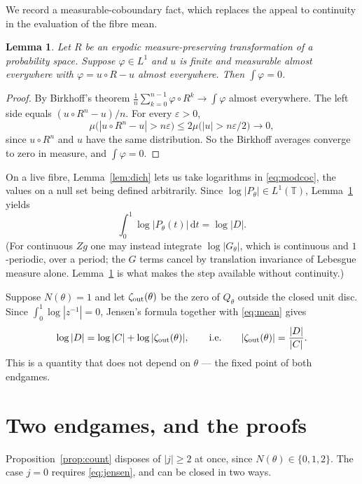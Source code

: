 \documentclass[11pt]{amsart}
\newtheorem{lemma}[theorem]{Lemma}
\theoremstyle{remark}
\newcommand{\T}{\mathbb T}
\newcommand{\dd}{\,\mathrm d}
\begin{document}
We record a measurable-coboundary fact, which replaces the appeal to continuity in the
evaluation of the fibre mean.

\begin{lemma}\label{lem:meanzero}
Let $R$ be an ergodic measure-preserving transformation of a probability space. Suppose
$\varphi\in L^1$ and $u$ is finite and measurable almost everywhere with $\varphi=u\circ R-u$
almost everywhere. Then $\int\varphi=0$.
\end{lemma}

\begin{proof}
By Birkhoff's theorem $\frac1n\sum_{k=0}^{n-1}\varphi\circ R^k\to\int\varphi$ almost
everywhere. The left side equals $(u\circ R^n-u)/n$. For every $\varepsilon>0$,
\[
\mu\bigl(|u\circ R^n-u|>n\varepsilon\bigr)\leq2\mu\bigl(|u|>n\varepsilon/2\bigr)\to0 ,
\]
since $u\circ R^n$ and $u$ have the same distribution. So the Birkhoff averages converge to
zero in measure, and $\int\varphi=0$.
\end{proof}

On a live fibre, Lemma~\ref{lem:dich} lets us take logarithms in \eqref{eq:modcoc}, the values
on a null set being defined arbitrarily. Since $\log|P_\theta|\in L^1(\T)$,
Lemma~\ref{lem:meanzero} yields
\begin{equation}\label{eq:mean}
\int_0^1\log|P_\theta(t)|\dd t=\log|D| .
\end{equation}
(For continuous $Zg$ one may instead integrate $\log|G_\theta|$, which is continuous and
$1$-periodic, over a period; the $G$ terms cancel by translation invariance of Lebesgue
measure alone. Lemma~\ref{lem:meanzero} is what makes the step available without continuity.)

Suppose $N(\theta)=1$ and let $\zeta_{\rm out}(\theta)$ be the zero of $Q_\theta$ outside the
closed unit disc. Since $\int_0^1\log|z^{-1}|=0$, Jensen's formula together with
\eqref{eq:mean} gives
\begin{equation}\label{eq:jensen}
\log|D|=\log|C|+\log|\zeta_{\rm out}(\theta)| ,
\qquad\text{i.e.}\qquad
|\zeta_{\rm out}(\theta)|=\frac{|D|}{|C|} .
\end{equation}
This is a quantity that does not depend on $\theta$ --- the fixed point of both endgames.

\section{Two endgames, and the proofs}\label{sec:endgame}

Proposition~\ref{prop:count} disposes of $|j|\geq2$ at once, since $N(\theta)\in\{0,1,2\}$.
The case $j=0$ requires \eqref{eq:jensen}, and can be closed in two ways.
\end{document}
